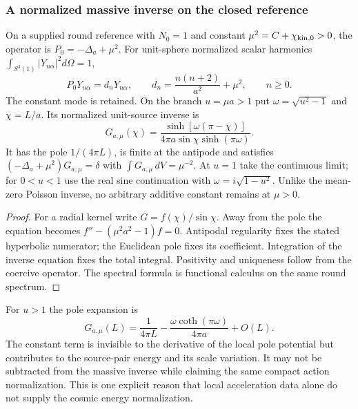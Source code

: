 \documentclass[12pt,a4paper]{article}
\begin{document}
\subsubsection{A normalized massive inverse on the closed reference}
\begin{proposition}
\label{p8:prop:v2206-massive-compact-inverse}
On a supplied round reference with $N_0=1$ and constant
$\mu^2=C+\chi_{{\rm kin},0}>0$, the operator is
$P_0=-\Delta_a+\mu^2$. For unit-sphere normalized scalar harmonics
$\int_{S^3(1)}|Y_{n\alpha}|^2d\Omega=1$,
\[
 P_0Y_{n\alpha}=d_nY_{n\alpha},\qquad
 d_n=\frac{n(n+2)}{a^2}+\mu^2,\qquad n\ge0.
\]
The constant mode is retained. On the branch $u=\mu a>1$ put
$\omega=\sqrt{u^2-1}$ and $\chi=L/a$. Its normalized unit-source inverse is
\begin{equation}
\label{p8:eq:v2206-massive-compact-inverse}
 \boxed{G_{a,\mu}(\chi)=
 \frac{\sinh[\omega(\pi-\chi)]}
 {4\pi a\sin\chi\sinh(\pi\omega)}.}
\end{equation}
It has the pole $1/(4\pi L)$, is finite at the antipode and satisfies
$(-\Delta_a+\mu^2)G_{a,\mu}=\delta$ with
$\int G_{a,\mu}\,dV=\mu^{-2}$.
At $u=1$ take the continuous limit; for $0<u<1$ use the real sine
continuation with $\omega=i\sqrt{1-u^2}$. Unlike the mean-zero
Poisson inverse, no arbitrary additive constant remains at $\mu>0$.
\end{proposition}
\begin{proof}
For a radial kernel write $G=f(\chi)/\sin\chi$. Away from the pole
the equation becomes $f''-(\mu^2a^2-1)f=0$. Antipodal regularity fixes
the stated hyperbolic numerator; the Euclidean pole fixes its coefficient.
Integration of the inverse equation fixes the total integral. Positivity
and uniqueness follow from the coercive operator. The spectral formula
is functional calculus on the same round spectrum.
\end{proof}

\begin{corollary}
\label{p8:cor:v2206-regular-part-energy}
For $u>1$ the pole expansion is
\[
 G_{a,\mu}(L)=\frac1{4\pi L}
       -\frac{\omega\coth(\pi\omega)}{4\pi a}+O(L).
\]
The constant term is invisible to the derivative of the local pole
potential but contributes to the source-pair energy and its scale
variation. It may not be subtracted from the massive inverse while
claiming the same compact action normalization. This is one explicit
reason that local acceleration data alone do not supply the cosmic
energy normalization.
\end{corollary}
\end{document}
